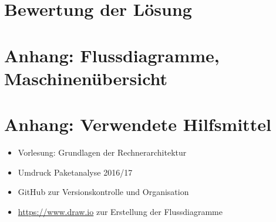\documentclass[12pt,titlepage,german,a4]{article}
\begin{document}
    \newpage

    \section{Bewertung der L{\"o}sung}

    \newpage

    \section{Anhang: Flussdiagramme, Maschinen{\"u}bersicht}

    \newpage

    \section{Anhang: Verwendete Hilfsmittel}
	\begin{itemize}
		\item Vorlesung: Grundlagen der Rechnerarchitektur
		\item Umdruck Paketanalyse 2016/17
		\item GitHub zur Versionskontrolle und Organisation
		\item \url{https://www.draw.io} zur Erstellung der Flussdiagramme
	\end{itemize}
\end{document}
